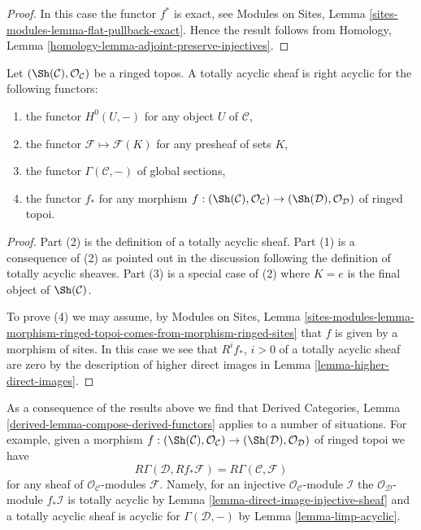 \begin{proof}
In this case the functor $f^*$ is exact, see
Modules on Sites, Lemma \ref{sites-modules-lemma-flat-pullback-exact}.
Hence the result follows from
Homology, Lemma \ref{homology-lemma-adjoint-preserve-injectives}.
\end{proof}

\begin{lemma}
\label{lemma-limp-acyclic}
Let $(\Sh(\mathcal{C}), \mathcal{O}_\mathcal{C})$ be a ringed topos.
A totally acyclic sheaf is right acyclic for the following functors:
\begin{enumerate}
\item the functor $H^0(U, -)$ for any object $U$ of $\mathcal{C}$,
\item the functor $\mathcal{F} \mapsto \mathcal{F}(K)$ for any
presheaf of sets $K$,
\item the functor $\Gamma(\mathcal{C}, -)$ of global sections,
\item the functor $f_*$ for any morphism
$f : (\Sh(\mathcal{C}), \mathcal{O}_\mathcal{C}) \to
(\Sh(\mathcal{D}), \mathcal{O}_\mathcal{D})$ of ringed topoi.
\end{enumerate}
\end{lemma}

\begin{proof}
Part (2) is the definition of a totally acyclic sheaf.
Part (1) is a consequence of (2) as pointed out in the discussion following the
definition of totally acyclic sheaves.
Part (3) is a special case of (2) where $K = e$ is the final object
of $\Sh(\mathcal{C})$.

\medskip\noindent
To prove (4) we may assume, by
Modules on Sites, Lemma
\ref{sites-modules-lemma-morphism-ringed-topoi-comes-from-morphism-ringed-sites}
that $f$ is given by a morphism of sites. In this case we see that
$R^if_*$, $i > 0$ of a totally acyclic sheaf are zero by the description of
higher direct images in
Lemma \ref{lemma-higher-direct-images}.
\end{proof}

\begin{remark}
\label{remark-before-Leray}
As a consequence of the results above we find that
Derived Categories, Lemma \ref{derived-lemma-compose-derived-functors}
applies to a number of situations. For example, given a
morphism $f : (\Sh(\mathcal{C}), \mathcal{O}_\mathcal{C}) \to
(\Sh(\mathcal{D}), \mathcal{O}_\mathcal{D})$ of ringed topoi we have
$$
R\Gamma(\mathcal{D}, Rf_*\mathcal{F}) = R\Gamma(\mathcal{C}, \mathcal{F})
$$
for any sheaf of $\mathcal{O}_\mathcal{C}$-modules $\mathcal{F}$.
Namely, for an injective $\mathcal{O}_\mathcal{C}$-module $\mathcal{I}$
the $\mathcal{O}_\mathcal{D}$-module $f_*\mathcal{I}$ is totally acyclic by
Lemma \ref{lemma-direct-image-injective-sheaf}
and a totally acyclic sheaf is acyclic for $\Gamma(\mathcal{D}, -)$ by
Lemma \ref{lemma-limp-acyclic}.
\end{remark}

